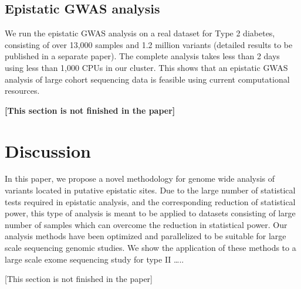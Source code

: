 \subsection{Epistatic GWAS analysis}

We run the epistatic GWAS analysis on a real dataset for Type 2 diabetes, consisting of over 13,000 samples and 1.2 million variants (detailed results to be published in a separate paper). The complete analysis takes less than 2 days using less than 1,000 CPUs in our cluster. This shows that an epistatic GWAS analysis of large cohort sequencing data is feasible using current computational resources.

\textbf{[This section is not finished in the paper]}

\section{Discussion}

In this paper, we propose a novel methodology for genome wide analysis of variants located in putative epistatic sites. Due to the large number of statistical tests required in epistatic analysis, and the corresponding reduction of statistical power, this type of analysis is meant to be applied to datasets consisting of large number of samples which can overcome the reduction in statistical power. Our analysis methods have been optimized and parallelized to be suitable for large scale sequencing genomic studies.
We show the application of these methods to a large scale exome sequencing study for type II …..

{ \huge [This section is not finished in the paper]}

